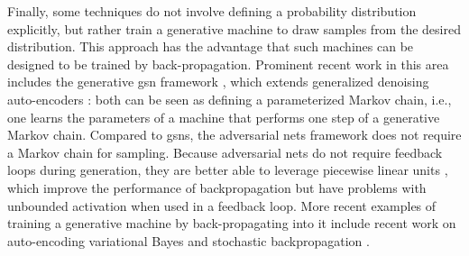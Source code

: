\noindent Finally, some techniques do not involve defining a probability distribution explicitly, but rather train a generative machine to draw samples from the desired distribution. This approach has the advantage that such machines can be designed to be trained by back-propagation. Prominent recent work in this area includes the generative \acrfull{gsn} framework \cite{5_bengio2014deepgenerativestochasticnetworks}, which extends generalized denoising auto-encoders \cite{4_NIPS2013_559cb990}: both can be seen as defining a parameterized Markov chain, i.e., one learns the parameters of a machine that performs one step of a generative Markov chain. Compared to \acrshort{gsns}, the adversarial nets framework does not require a Markov chain for sampling. Because adversarial nets do not require feedback loops during generation, they are better able to leverage piecewise linear units \cite{19_5459469,9_pmlr-v15-glorot11a,10_goodfellow2013maxoutnetworks}, which improve the performance of backpropagation but have problems with unbounded activation when used in a feedback loop. More recent examples of training a generative machine by back-propagating into it include recent work on auto-encoding variational Bayes \cite{20_kingma2022autoencodingvariationalbayes} and stochastic backpropagation \cite{24_rezende2014stochasticbackpropagationapproximateinference}.
